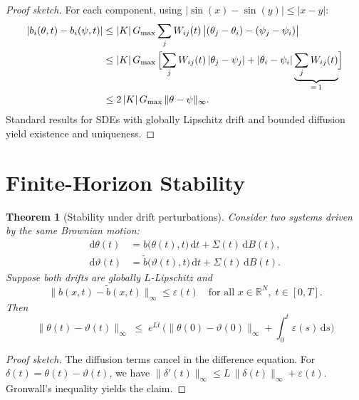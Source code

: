 \documentclass[11pt,a4paper]{article}
\theoremstyle{plain}
\newtheorem{theorem}{Theorem}[section]
\theoremstyle{definition}
\theoremstyle{remark}
\newcommand{\Gmax}{G_{\max}}
\begin{document}
\begin{proof}[Proof sketch]
For each component, using $|\sin(x) - \sin(y)| \leq |x - y|$:
\begin{align}
|b_i(\theta,t) - b_i(\psi,t)|
&\leq |K|\,\Gmax \sum_j W_{ij}(t)\,\bigl|(\theta_j - \theta_i) - (\psi_j - \psi_i)\bigr| \notag\\
&\leq |K|\,\Gmax\,\Bigl[\sum_j W_{ij}(t)\,|\theta_j - \psi_j| + |\theta_i - \psi_i|\underbrace{\sum_j W_{ij}(t)}_{=\,1}\Bigr] \notag\\
&\leq 2\,|K|\,\Gmax\,\|\theta - \psi\|_{\infty}. \label{eq:lip_detail}
\end{align}
Standard results for SDEs with globally Lipschitz drift and bounded diffusion yield existence and uniqueness.
\end{proof}


\section{Finite-Horizon Stability}

\begin{theorem}[Stability under drift perturbations]
\label{satz:stabilitaet}
Consider two systems driven by the same Brownian motion:
\begin{align}
\mathrm{d}\theta(t) &= b\bigl(\theta(t),t\bigr)\,\mathrm{d}t + \Sigma(t)\,\mathrm{d}B(t), \\
\mathrm{d}\vartheta(t) &= \tilde{b}\bigl(\vartheta(t),t\bigr)\,\mathrm{d}t + \Sigma(t)\,\mathrm{d}B(t).
\end{align}
Suppose both drifts are globally $L$-Lipschitz and
\begin{equation}
\|b(x,t) - \tilde{b}(x,t)\|_{\infty} \leq \varepsilon(t) \quad \text{for all } x \in \mathbb{R}^N,\; t \in [0,T].
\end{equation}
Then
\begin{equation}
\label{eq:gronwall}
\boxed{\;
\|\theta(t) - \vartheta(t)\|_{\infty}
\;\leq\; e^{Lt}\,\biggl(\|\theta(0) - \vartheta(0)\|_{\infty} + \int_0^t \varepsilon(s)\,\mathrm{d}s\biggr)
\;}
\end{equation}
\end{theorem}

\begin{proof}[Proof sketch]
The diffusion terms cancel in the difference equation. For $\delta(t) = \theta(t) - \vartheta(t)$, we have $\|\delta'(t)\|_{\infty} \leq L\,\|\delta(t)\|_{\infty} + \varepsilon(t)$. Gronwall's inequality yields the claim.
\end{proof}
\end{document}
